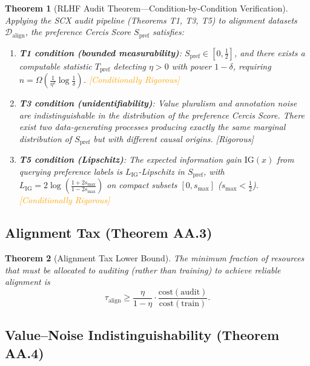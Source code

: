 \documentclass[12pt,a4paper]{article}
\newtheorem{theorem}{Theorem}[section]
\newcommand{\rigorous}{\textcolor{green!50!black}{\small\textsf{[Rigorous]}}}
\newcommand{\conditionallyrigorous}{\textcolor{orange}{\small\textsf{[Conditionally Rigorous]}}}
\newcommand{\cD}{\mathcal{D}}
\begin{document}
\begin{theorem}[RLHF Audit Theorem---Condition-by-Condition Verification]
\label{thm:pref-noise}
Applying the \textsf{SCX} audit pipeline (Theorems T1, T3, T5) to alignment datasets $\cD_{\mathrm{align}}$, the preference Cercis Score $S_{\mathrm{pref}}$ satisfies:
\begin{enumerate}[label=(\roman*)]
    \item \textbf{T1 condition (bounded measurability)}: $S_{\mathrm{pref}} \in [0,\frac12]$, and there exists a computable statistic $T_{\mathrm{pref}}$ detecting $\eta>0$ with power $1-\delta$, requiring $n = \Omega(\frac{1}{\eta^2}\log\frac{1}{\delta})$. \conditionallyrigorous
    \item \textbf{T3 condition (unidentifiability)}: Value pluralism and annotation noise are indistinguishable in the distribution of the preference Cercis Score. There exist two data-generating processes producing exactly the same marginal distribution of $S_{\mathrm{pref}}$ but with different causal origins. \rigorous
    \item \textbf{T5 condition (Lipschitz)}: The expected information gain $\mathrm{IG}(x)$ from querying preference labels is $L_{\mathrm{IG}}$-Lipschitz in $S_{\mathrm{pref}}$, with $L_{\mathrm{IG}} = 2\log(\frac{1+2s_{\max}}{1-2s_{\max}})$ on compact subsets $[0, s_{\max}]$ ($s_{\max} < \frac12$). \conditionallyrigorous
\end{enumerate}
\end{theorem}

\subsection{Alignment Tax (Theorem AA.3)}

\begin{theorem}[Alignment Tax Lower Bound]
\label{thm:align-tax}
The minimum fraction of resources that must be allocated to auditing (rather than training) to achieve reliable alignment is
\[
\tau_{\mathrm{align}} \geq \frac{\eta}{1-\eta}\cdot \frac{\mathrm{cost}(\mathrm{audit})}{\mathrm{cost}(\mathrm{train})}.
\]
\end{theorem}

\subsection{Value--Noise Indistinguishability (Theorem AA.4)}
\end{document}
